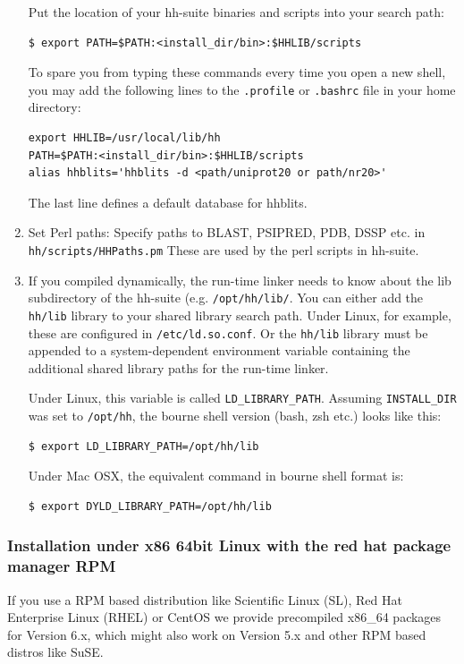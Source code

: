 \documentclass[11pt,a4paper]{article}
\begin{document}
\begin{enumerate}
Put the location of your hh-suite binaries and scripts into your search path:
\begin{verbatim}
$ export PATH=$PATH:<install_dir/bin>:$HHLIB/scripts
\end{verbatim}

To spare you from typing these commands every time you open a new shell, you may add the following lines to the \verb`.profile` or \verb`.bashrc` file in your home directory:
\begin{verbatim}
export HHLIB=/usr/local/lib/hh
PATH=$PATH:<install_dir/bin>:$HHLIB/scripts
alias hhblits='hhblits -d <path/uniprot20 or path/nr20>'
\end{verbatim}
The last line defines a default database for hhblits. 

\item Set Perl paths: Specify paths to BLAST, PSIPRED, PDB, DSSP etc. in 
\verb`hh/scripts/HHPaths.pm`
These are used by the perl scripts in hh-suite.


\item If you compiled dynamically, the run-time linker needs to know about the lib subdirectory 
of the hh-suite (e.g. \verb`/opt/hh/lib/`.
You can either add the \verb`hh/lib` library to your shared library search path. 
Under Linux, for example, these are configured in \verb`/etc/ld.so.conf`. 
Or the \verb`hh/lib` library must be appended to a system-dependent environment variable 
containing the additional shared library paths for the run-time linker.

Under Linux, this variable is called \verb`LD_LIBRARY_PATH`. 
Assuming \verb`INSTALL_DIR` was set to \verb`/opt/hh`, the bourne shell version (bash, zsh etc.) looks like this:
\begin{verbatim}
$ export LD_LIBRARY_PATH=/opt/hh/lib
\end{verbatim}

Under Mac OSX, the equivalent command in bourne shell format is:
\begin{verbatim}
$ export DYLD_LIBRARY_PATH=/opt/hh/lib
\end{verbatim}


\end{enumerate}

\subsubsection*{Installation under x86 64bit Linux with the red hat package manager RPM}

If you use a RPM based distribution like Scientific Linux (SL), Red Hat Enterprise Linux (RHEL) or CentOS we provide precompiled x86\_64 packages for
Version 6.x, which might also work on Version 5.x and other RPM based distros
like SuSE.
\end{document}
